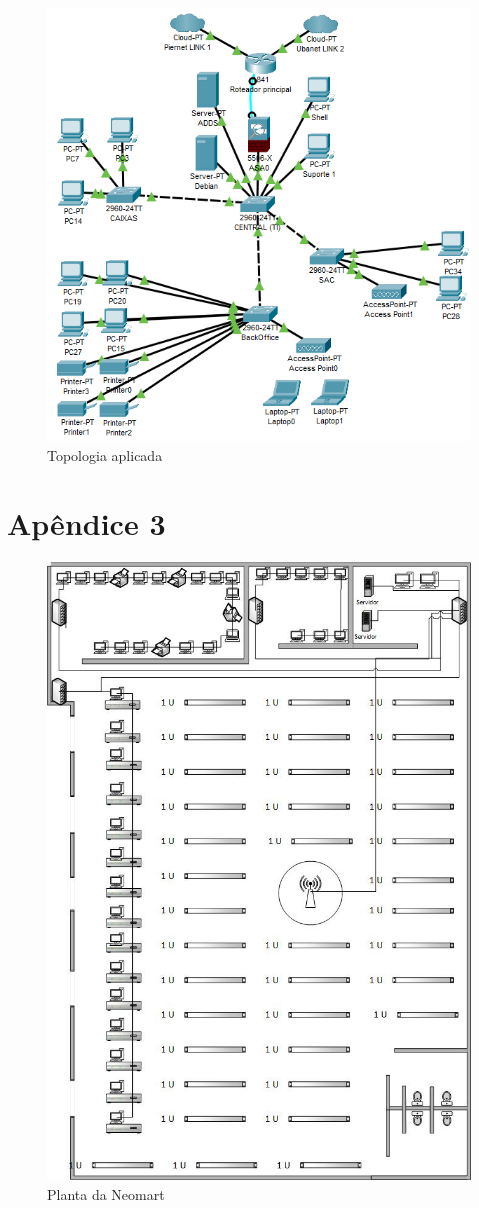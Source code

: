 \documentclass[12pt]{article}
\begin{document}
\begin{figure}[ht]
    \centering
    \includegraphics[height=0.7\textwidth]{cisco01.jpeg}
    \caption{Topologia aplicada}
    \label{fig:cisco-topologia}
\end{figure}

\newpage

\section{Apêndice 3} 

\begin{figure}[ht]
    \centering
    \includegraphics[height=0.7\textwidth]{planta PI II.jpg}
    \caption{Planta da Neomart}
    \label{fig:cisco-topologia}
\end{figure}
\end{document}
